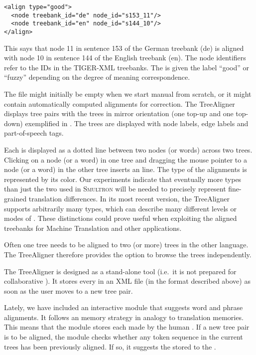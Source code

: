 \documentclass[output=paper]{LSP/langsci}
\begin{document}
\ea
\begin{lstlisting}
<align type="good"> 
  <node treebank_id="de" node_id="s153_11"/> 
  <node treebank_id="en" node_id="s144_10"/> 
</align>
\end{lstlisting}
\z 

This says that node 11 in sentence 153 of the German treebank (de) is aligned with node 10 in sentence 144 of the English treebank (en). The node identifiers refer to the IDs in the TIGER-XML treebanks. The  is given the label ``good'' or ``fuzzy'' depending on the degree of meaning correspondence. 


The  file might initially be empty when we start manual  from scratch, or it might contain automatically computed alignments for correction. The TreeAligner displays tree pairs with the trees in mirror orientation (one top-up and one top-down) exemplified in . The trees are displayed with node labels, edge labels and part-of-speech tags. 

Each  is displayed as a dotted line between two nodes (or words) across two trees. Clicking on a node (or a word) in one tree and dragging the mouse pointer to a node (or a word) in the other tree inserts an  line. The type of the alignments is represented by its color. Our experiments indicate that eventually more  types than just the two used in S\textsc{multron} will be needed to precisely represent fine-grained translation differences. In its most recent version, the TreeAligner supports arbitrarily many  types, which can describe many different levels or modes of . These distinctions could prove useful when exploiting the aligned treebanks for Machine Translation and other applications. 

Often one tree needs to be aligned to two (or more) trees in the other language. The TreeAligner therefore provides the option to browse the trees independently. 

The TreeAligner is designed as a stand-alone tool (i.e.~it is not prepared for collaborative ). It stores every  in an XML file (in the format described above) as soon as the user moves to a new tree pair. 

Lately, we have included an interactive module that suggests word and phrase alignments. It follows an  memory strategy in analogy to translation memories. This means that the module stores each  made by the human . If a new tree pair is to be aligned, the module checks whether any token sequence in the current trees has been previously aligned. If so, it suggests the stored  to the . 
\end{document}
